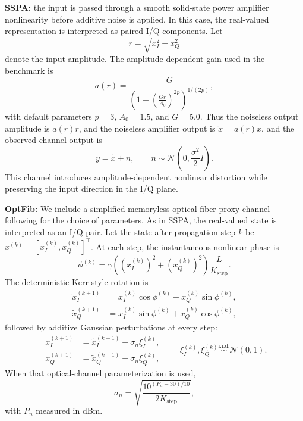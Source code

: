 \documentclass[conference]{IEEEtran}
\begin{document}
\textbf{SSPA:}
the input is passed through a smooth solid-state power amplifier nonlinearity before additive noise is applied.
In this case, the real-valued representation is interpreted as paired I/Q components.
Let
\begin{equation}
r = \sqrt{x_I^2 + x_Q^2}
\end{equation}
denote the input amplitude.
The amplitude-dependent gain used in the benchmark is
\begin{equation}
a(r)
=
\frac{G}{\left(1+\left(\frac{Gr}{A_0}\right)^{2p}\right)^{1/(2p)}},
\end{equation}
with default parameters \(p=3\), \(A_0=1.5\), and \(G=5.0\).
Thus the noiseless output amplitude is \(a(r)r\), and the noiseless amplifier output is \(\tilde{x} = a(r)x\).
and the observed channel output is
\begin{equation}
y = \tilde{x} + n,
\qquad
n \sim \mathcal{N}\!\left(0,\frac{\sigma^2}{2}I\right).
\end{equation}
This channel introduces amplitude-dependent nonlinear distortion while preserving the input direction in the I/Q plane.

\textbf{OptFib:}
We include a simplified memoryless optical-fiber proxy channel following \cite{li2018e2efiber} for the choice of parameters.
As in SSPA, the real-valued state is interpreted as an I/Q pair.
Let the state after propagation step \(k\) be \(x^{(k)} = [x_I^{(k)},x_Q^{(k)}]^\top\).
At each step, the instantaneous nonlinear phase is
\begin{equation}
\phi^{(k)}
=
\gamma
\left(\left(x_I^{(k)}\right)^2 + \left(x_Q^{(k)}\right)^2\right)\frac{L}{K_{\text{step}}}.
\end{equation}
The deterministic Kerr-style rotation is
\begin{equation}
\begin{aligned}
\tilde{x}_I^{(k+1)} &= x_I^{(k)}\cos\phi^{(k)} - x_Q^{(k)}\sin\phi^{(k)}, \\
\tilde{x}_Q^{(k+1)} &= x_I^{(k)}\sin\phi^{(k)} + x_Q^{(k)}\cos\phi^{(k)},
\end{aligned}
\end{equation}
followed by additive Gaussian perturbations at every step:
\begin{equation}
\begin{aligned}
x_I^{(k+1)} &= \tilde{x}_I^{(k+1)} + \sigma_n \xi_I^{(k)}, \\
x_Q^{(k+1)} &= \tilde{x}_Q^{(k+1)} + \sigma_n \xi_Q^{(k)},
\end{aligned}
\qquad
\xi_I^{(k)},\xi_Q^{(k)} \overset{\text{i.i.d.}}{\sim} \mathcal{N}(0,1).
\end{equation}
When that optical-channel parameterization is used,
\begin{equation}
\sigma_n
=
\sqrt{\frac{10^{(P_n-30)/10}}{2K_{\text{step}}}},
\end{equation}
with \(P_n\) measured in dBm.
\end{document}
